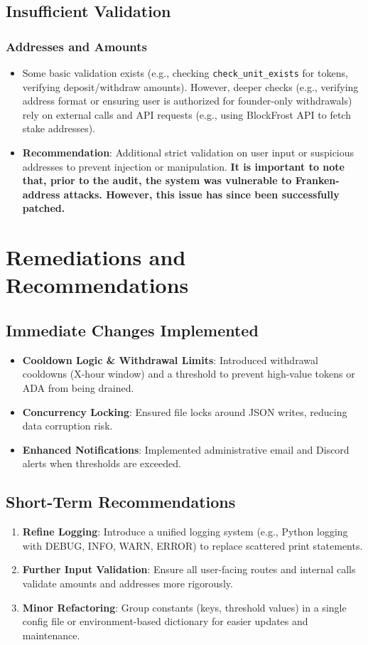 \documentclass[11pt,a4paper]{report}
\begin{document}
\section{Insufficient Validation}

\subsection{Addresses and Amounts}
\begin{itemize}
    \item Some basic validation exists (e.g., checking \texttt{check\_unit\_exists} for tokens, verifying deposit/withdraw amounts). However, deeper checks (e.g., verifying address format or ensuring user is authorized for founder-only withdrawals) rely on external calls and API requests (e.g., using BlockFrost API to fetch stake addresses).
    \item \textbf{Recommendation}: Additional strict validation on user input or suspicious addresses to prevent injection or manipulation. \textbf{It is important to note that, prior to the audit, the system was vulnerable to Franken-address attacks. However, this issue has since been successfully patched.}
\end{itemize}

\chapter{Remediations and Recommendations}

\section{Immediate Changes Implemented}
\begin{itemize}
    \item \textbf{Cooldown Logic \& Withdrawal Limits}: Introduced withdrawal cooldowns (X-hour window) and a threshold to prevent high-value tokens or ADA from being drained.
    \item \textbf{Concurrency Locking}: Ensured file locks around JSON writes, reducing data corruption risk.
    \item \textbf{Enhanced Notifications}: Implemented administrative email and Discord alerts when thresholds are exceeded.
\end{itemize}

\section{Short-Term Recommendations}
\begin{enumerate}
    \item \textbf{Refine Logging}: Introduce a unified logging system (e.g., Python logging with DEBUG, INFO, WARN, ERROR) to replace scattered print statements.
    \item \textbf{Further Input Validation}: Ensure all user-facing routes and internal calls validate amounts and addresses more rigorously.
    \item \textbf{Minor Refactoring}: Group constants (keys, threshold values) in a single config file or environment-based dictionary for easier updates and maintenance.
\end{enumerate}
\end{document}
